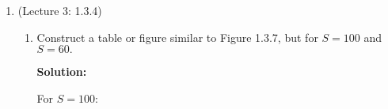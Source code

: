\documentclass[11pt]{article} %
\begin{document}
\begin{enumerate}
\begin{enumerate}
{\bf Solution:} We see that 72.3 percent of jobs were delayed.  I'm not sure what the problem means by "how does this proportion relate to the utilization", but I'll guess it's asking how the fact that the queue is single-server FIFO affects the proportion delayed.  If the queue were SJF (shortest job first), the only jobs delayed would be the jobs that took the longest to process, because they would go last and the shortest jobs would be completed before more jobs came into the service node.  If there were more than one server for the queue, that would also lower the percentage delayed because more than one job could be processed at once.

\end{enumerate}

\newpage

\setcounter{enumi}{2}
\item (Lecture 3: 1.3.4) \begin{enumerate}

\item Construct a table or figure similar to Figure 1.3.7, but for $S=100$ and $S=60.$

{\bf Solution:} 

For $S = 100$:


\end{enumerate}
\end{enumerate}
\end{document}
